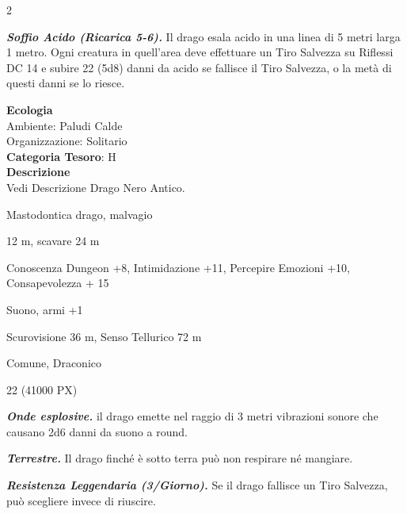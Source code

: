 \begin{multicols}{2}
{\emph{\textbf{Soffio Acido (Ricarica 5-6).}} Il drago esala acido in una linea di 5 metri larga 1 metro. Ogni creatura in quell'area deve effettuare un Tiro Salvezza su Riflessi DC 14 e subire 22 (5d8) danni da acido se fallisce il Tiro Salvezza, o la metà di questi danni se lo riesce.

\textbf{Ecologia}\\
Ambiente: Paludi Calde\\
Organizzazione: Solitario\\
\textbf{Categoria Tesoro}: H\\
\textbf{Descrizione}\\
Vedi Descrizione Drago Nero Antico.

\begin{description}[noitemsep, topsep=0pt, parsep=0pt, partopsep=0pt, itemsep=1pt, leftmargin=2.35cm,  labelwidth=2.2cm, itemindent=0cm, listparindent=0pt] %
\setlength{\baselineskip}{10pt}
\item[\textbf{Taglia/Tipo}] Mastodontica drago, malvagio
\item[\textbf{Caratt.}] 
\item[\textbf{Punti Ferita}] 
\item[\textbf{Movimento}] 12 m, scavare 24 m
\item[\textbf{Tiri Salvez.}] 
\item[\textbf{Comp.}] Conoscenza Dungeon +8, Intimidazione +11, Percepire Emozioni +10, Consapevolezza + 15
\item[\textbf{Imm. Danni}] Suono, armi +1
\item[\textbf{Sensi}] Scurovisione 36 m, Senso Tellurico 72 m
\item[\textbf{Linguaggi}] Comune, Draconico
\item[\textbf{Sfida}] 22 (41000 PX)
\end{description}
\smallskip

\emph{\textbf{Onde esplosive.}} il drago emette nel raggio di 3 metri vibrazioni sonore che causano 2d6 danni da suono a round.

\emph{\textbf{Terrestre.}} Il drago finché è sotto terra può non respirare né mangiare.

\emph{\textbf{Resistenza Leggendaria (3/Giorno).}} Se il drago fallisce un Tiro Salvezza, può scegliere invece di riuscire.

}
\end{multicols}
